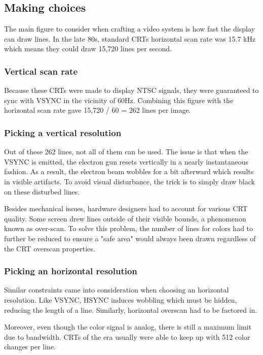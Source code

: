 \subsection{Making choices}
 The main figure to consider when crafting a video system is how fast the display can draw lines. In the late 80s, standard CRTs horizontal scan rate was 15.7 kHz which means they could draw 15,720 lines per second.





\subsubsection{Vertical scan rate}
Because these CRTs were made to display NTSC signals, they were guaranteed to sync with VSYNC in the vicinity of 60Hz. Combining this figure with the horizontal scan rate gave 15,720 / 60 = 262 lines per image.


\subsubsection{Picking a vertical resolution}
Out of these 262 lines, not all of them can be used. The issue is that when the VSYNC is emitted, the electron gun resets vertically in a nearly instantaneous fashion. As a result, the electron beam wobbles for a bit afterward which results in visible artifacts. To avoid visual disturbance, the trick is to simply draw black on these disturbed lines. 

Besides mechanical issues, hardware designers had to account for various CRT quality. Some screen drew lines outside of their visible bounds, a phenomenon known as over-scan. To solve this problem, the number of lines for colors had to further be reduced to ensure a "safe area" would always been drawn regardless of the CRT overscan properties.



\subsubsection{Picking an horizontal resolution}
Similar constraints came into consideration when choosing an horizontal resolution. Like VSYNC, HSYNC induces wobbling which must be hidden, reducing the length of a line. Similarly, horizontal overscan had to be factored in.

Moreover, even though the color signal is analog, there is still a maximum limit due to bandwidth. CRTs of the era usually were able to keep up with 512 color changes per line.

